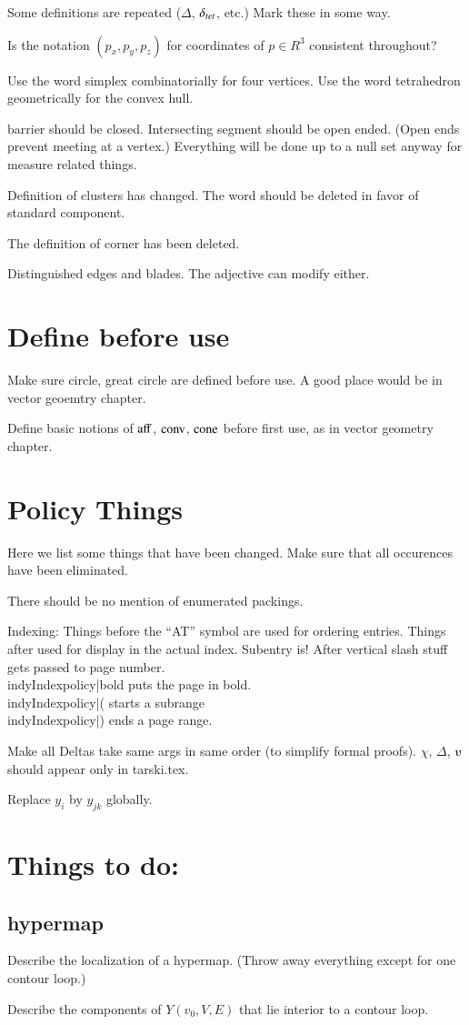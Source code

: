 Some definitions are repeated ($\Delta$, $\delta_{tet}$, etc.)
Mark these in some way.

Is the notation $(p_x,p_y,p_z)$ for coordinates 
of $p\in R^3$ consistent throughout?

Use the word simplex combinatorially for four vertices.
Use the word tetrahedron geometrically for the convex hull.

barrier should be closed. Intersecting segment should be open ended.
(Open ends prevent meeting at a vertex.)
Everything will be done up to a null set
anyway for measure related things.

Definition of clusters has changed.  The word should be deleted
in favor of standard component.  

The definition of corner has been deleted.

Distinguished edges and blades.  The adjective can modify either.




\section{Define before use}

Make sure circle, great circle are defined before use.
A good place would be in vector geoemtry chapter.

Define basic notions of ${\operatorname{aff}}$, ${\operatorname{conv}}$, ${\operatorname{cone}}$
before first use, as in vector geometry chapter.


\section{Policy Things}

Here we list some things that have been changed.  Make sure that
all occurences have been eliminated.

There should be no mention of enumerated packings.

Indexing: Things before the ``AT'' symbol are used for ordering entries.
Things after used for display in the actual index.
Subentry is!  After vertical slash stuff gets passed to page
number.  \\indy{Index}{policy|bold}  puts the page in bold.
\\indy{Index}{policy|(} starts a subrange \\indy{Index}{policy|)} ends a page range.

Make all Deltas take same args in same order (to simplify formal proofs).
$\chi$, $\Delta$, $\ups$ should appear only in tarski.tex. 




Replace $y_i$ by $y_{jk}$ globally.




\section{Things to do:}

\subsection{hypermap}
Describe the localization of a hypermap.  (Throw away everything
except for one contour loop.)

Describe the components of $Y(v_0,V,E)$ that lie interior to
a contour loop.  



